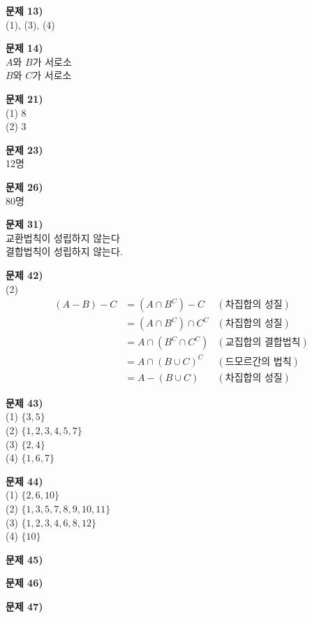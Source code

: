 \documentclass{oblivoir}
\newcommand\an[1]{\par\bigskip\noindent\textbf{문제 #1)}\\}
\begin{document}
%
\an{13}
(1), (3), (4)

%
\an{14}
\(A\)와 \(B\)가 서로소\\
\(B\)와 \(C\)가 서로소

%
\an{21}
(1) \(8\)\\
(2) \(3\)

%
\an{23}
12명

%
\an{26}
80명

%
\an{31}
교환법칙이 성립하지 않는다\\
결합법칙이 성립하지 않는다.

%
\an{42}
(2)
\begin{align*}
(A-B)-C
&=(A\cap B^C)-C			&(\text{차집합의 성질})\\
&=(A\cap B^C)\cap C^C		&(\text{차집합의 성질})\\
&=A\cap(B^C\cap C^C)		&(\text{교집합의 결합법칙})\\
&=A\cap(B\cup C)^C		&(\text{드모르간의 법칙})\\
&=A-(B\cup C)				&(\text{차집합의 성질})
\end{align*}

%
\an{43}
(1) \(\{3,5\}\)\\
(2) \(\{1,2,3,4,5,7\}\)\\
(3) \(\{2,4\}\)\\
(4) \(\{1,6,7\}\)

%
\an{44}
(1) \(\{2,6,10\}\)\\
(2) \(\{1,3,5,7,8,9,10,11\}\)\\
(3) \(\{1,2,3,4,6,8,12\}\)\\
(4) \(\{10\}\)

%
\an{45}

%
\an{46}

%
\an{47}
\end{document}
